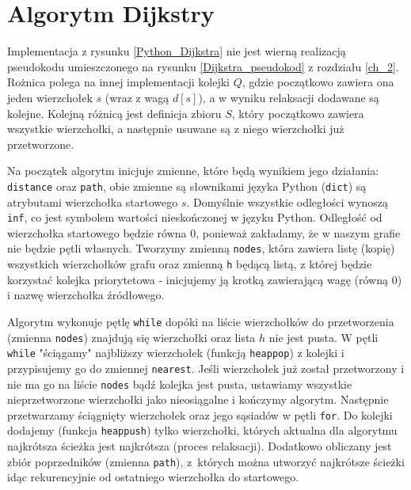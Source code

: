 \documentclass[12pt,a4paper]{book}
\theoremstyle{definition}
\numberwithin{equation}{chapter}
\begin{document}


\section{Algorytm Dijkstry}



Implementacja z rysunku \ref{Python_Dijkstra} nie jest wierną realizacją pseudokodu umieszczonego na rysunku \ref{Dijkstra_pseudokod} z rozdziału \ref{ch_2}. Rożnica polega na innej implementacji kolejki $Q$, gdzie początkowo zawiera ona jeden wierzchołek $s$ (wraz z wagą $d[s]$), a w wyniku relaksacji dodawane są kolejne. Kolejną różnicą jest definicja zbioru $S$, który początkowo zawiera wszystkie wierzchołki, a następnie usuwane są z niego wierzchołki już przetworzone.

Na początek algorytm inicjuje zmienne, które będą wynikiem jego działania: \texttt{distance} oraz \texttt{path}, obie zmienne są słownikami języka Python (\texttt{dict}) są atrybutami wierzchołka startowego $s$. Domyślnie wszystkie odległości wynoszą \texttt{inf}, co jest symbolem wartości nieskończonej w języku Python. Odległość od wierzchołka startowego będzie równa $0$, ponieważ zakładamy, że w naszym grafie nie będzie pętli własnych. Tworzymy zmienną \texttt{nodes}, która zawiera listę (kopię) wszystkich wierzchołków grafu oraz zmienną \texttt{h} będącą listą, z której będzie korzystać kolejka priorytetowa - inicjujemy ją krotką zawierającą wagę (równą $0$) i  nazwę wierzchołka źródłowego.

Algorytm wykonuje pętlę \texttt{while} dopóki na liście wierzchołków do przetworzenia (zmienna \texttt{nodes}) znajdują się wierzchołki oraz lista $h$ nie jest pusta. W pętli \texttt{while} "ściągamy" najbliższy wierzchołek (funkcją \texttt{heappop}) z kolejki i przypisujemy go do zmiennej \texttt{nearest}. Jeśli wierzchołek już został przetworzony i nie ma go na liście \texttt{nodes} bądź kolejka jest pusta, ustawiamy wszystkie nieprzetworzone wierzchołki jako nieosiągalne i kończymy algorytm. Następnie przetwarzamy ściągnięty wierzchołek oraz jego sąsiadów w pętli \texttt{for}. Do kolejki dodajemy (funkcja \texttt{heappush}) tylko wierzchołki, których aktualna dla algorytmu najkrótsza ścieżka jest najkrótsza (proces relaksacji). Dodatkowo obliczany jest zbiór poprzedników (zmienna \texttt{path}), z~których można utworzyć najkrótsze ścieżki idąc rekurencyjnie od ostatniego wierzchołka do startowego.
\end{document}
